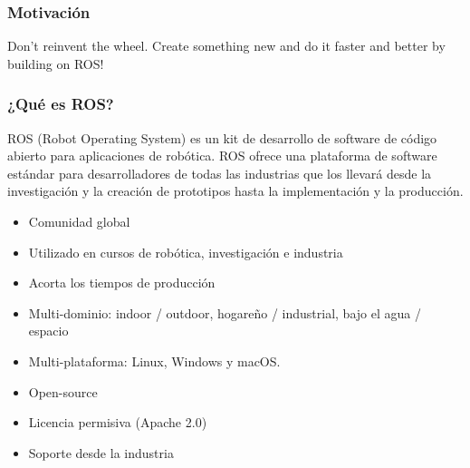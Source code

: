 \begin{frame}
	\frametitle{Motivación}
	
	Don’t reinvent the wheel. Create something new and do it faster and better by building on ROS!
	
	
	
	
\end{frame}

\begin{frame}
	\frametitle{¿Qué es ROS?}
	
	ROS (Robot Operating System) es un kit de desarrollo de software de código abierto para aplicaciones de robótica. ROS ofrece una plataforma de software estándar para desarrolladores de todas las industrias que los llevará desde la investigación y la creación de prototipos hasta la implementación y la producción.
	
	\begin{itemize}
		\item Comunidad global
		\item Utilizado en cursos de robótica, investigación e industria
		\item Acorta los tiempos de producción
		\item Multi-dominio: indoor / outdoor, hogareño / industrial, bajo el agua / espacio
		\item Multi-plataforma: Linux, Windows y macOS.
		\item Open-source
		\item Licencia permisiva (Apache 2.0)
		\item Soporte desde la industria
	\end{itemize}
	
	
	
	
\end{frame}


